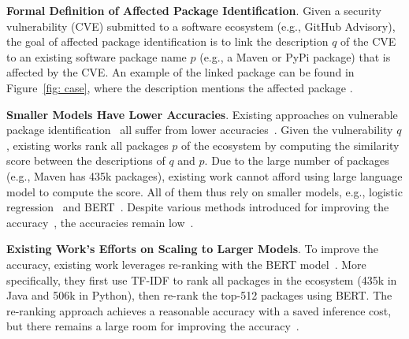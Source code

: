 \noindent \textbf{Formal Definition of Affected Package Identification}. Given a security vulnerability (CVE) submitted to a software ecosystem (e.g., GitHub Advisory), the goal of affected package identification is to link the description $q$ of the CVE to an existing software package name $p$ (e.g., a Maven or PyPi package) that is affected by the CVE. An example of the linked package can be found in Figure~\ref{fig: case}, where the description mentions the affected package . 


\noindent \textbf{Smaller Models Have Lower Accuracies}. 
Existing approaches on vulnerable package identification~\cite{fastxml, viem, lightxml, chronos} all suffer from lower accuracies~\cite{chronos,vullibminer}. Given the vulnerability $q$, existing works rank all packages $p$ of the ecosystem by computing the similarity score between the descriptions of $q$ and $p$. Due to the large number of packages (e.g., Maven has 435k packages), existing work cannot afford using large language model to compute the score. All of them thus rely on smaller models, e.g., logistic regression~\cite{zestxml,chronos} and BERT~\cite{lightxml,vullibminer}. Despite various methods introduced for improving the accuracy~\cite{viem, anwar2021cleaning}, the accuracies remain low~\cite{vullibminer}.

\noindent \textbf{Existing Work's Efforts on Scaling to Larger Models}. To improve the accuracy, existing work leverages re-ranking with the BERT model~\cite{vullibminer}. More specifically, they first use TF-IDF to rank all packages in the ecosystem (435k in Java and 506k in Python), then re-rank the top-512 packages using BERT. The re-ranking approach achieves a reasonable accuracy with a saved inference cost, but there remains a large room for improving the accuracy~\cite{vullibminer}.


